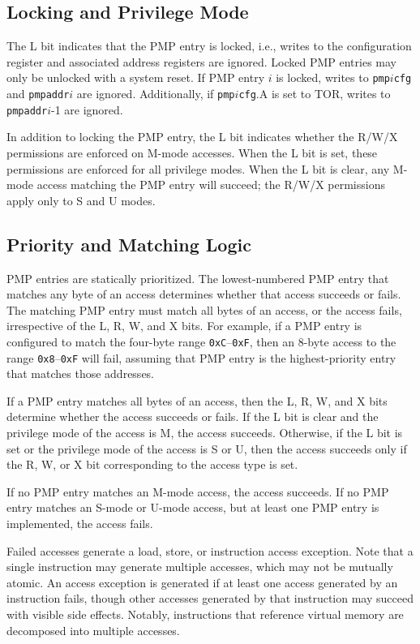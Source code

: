 \subsection{Locking and Privilege Mode}

The L bit indicates that the PMP entry is locked, i.e., writes to the
configuration register and associated address registers are ignored.  Locked
PMP entries may only be unlocked with a system reset.  If PMP entry $i$ is
locked, writes to \texttt{pmp}$i$\texttt{cfg} and \texttt{pmpaddr}$i$ are ignored.
Additionally, if \texttt{pmp}$i$\texttt{cfg}.A is set to TOR, writes to {\tt
pmpaddr}$i$-1 are ignored.

In addition to locking the PMP entry, the L bit indicates whether the R/W/X
permissions are enforced on M-mode accesses.  When the L bit is set, these
permissions are enforced for all privilege modes.  When the L bit is clear,
any M-mode access matching the PMP entry will succeed; the R/W/X
permissions apply only to S and U modes.

%

\subsection{Priority and Matching Logic}

PMP entries are statically prioritized.  The lowest-numbered PMP entry that
matches any byte of an access determines whether that access succeeds or
fails.  The matching PMP entry must match all bytes of an access, or the
access fails, irrespective of the L, R, W, and X bits.  For example, if a PMP
entry is configured to match the four-byte range \texttt{0xC}--\texttt{0xF}, then an
8-byte access to the range \texttt{0x8}--\texttt{0xF} will fail, assuming that
PMP entry is the highest-priority entry that matches those addresses.

If a PMP entry matches all bytes of an access, then the L, R, W, and X bits
determine whether the access succeeds or fails.  If the L bit is clear and the
privilege mode of the access is M, the access succeeds.  Otherwise, if the
L bit is set or the privilege mode of the access is S or U, then the access
succeeds only if the R, W, or X bit corresponding to the access type is set.

If no PMP entry matches an M-mode access, the access succeeds.  If no PMP
entry matches an S-mode or U-mode access, but at least one PMP entry is
implemented, the access fails.

Failed accesses generate a load, store, or instruction access exception.  Note
that a single instruction may generate multiple accesses, which may not be
mutually atomic.  An access exception is generated if at least one access
generated by an instruction fails, though other accesses generated by that
instruction may succeed with visible side effects.  Notably, instructions that
reference virtual memory are decomposed into multiple accesses.
